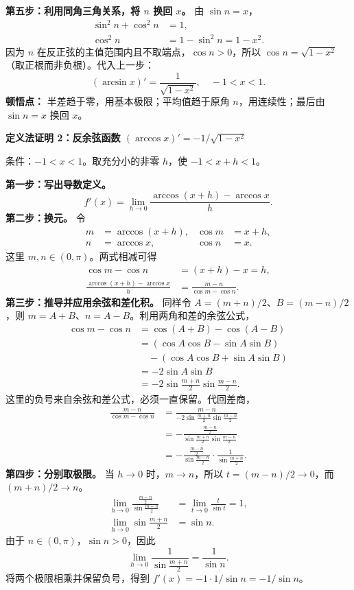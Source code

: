 \begin{proofbox}
\textbf{第五步：利用同角三角关系，将 $n$ 换回 $x$。} 由 $\sin n=x$，
\[
\begin{aligned}
\sin^2n+\cos^2n&=1,\\
\cos^2n&=1-\sin^2n=1-x^2.
\end{aligned}
\]
因为 $n$ 在反正弦的主值范围内且不取端点，$\cos n>0$，所以 $\cos n=\sqrt{1-x^2}$（取正根而非负根）。代入上一步：
\[
\boxed{(\arcsin x)'=\frac{1}{\sqrt{1-x^2}},\quad -1<x<1}.
\]
\textbf{顿悟点：} 半差趋于零，用基本极限；平均值趋于原角 $n$，用连续性；最后由 $\sin n=x$ 换回 $x$。

\medskip
\textbf{定义法证明 2：反余弦函数 $(\arccos x)'=-1/\sqrt{1-x^2}$}

条件：$-1<x<1$。取充分小的非零 $h$，使 $-1<x+h<1$。

\textbf{第一步：写出导数定义。}
\[
f'(x)=\lim_{h\to0}\frac{\arccos(x+h)-\arccos x}{h}.
\]
\textbf{第二步：换元。} 令
\[
\begin{aligned}
m&=\arccos(x+h),&\cos m&=x+h,\\
n&=\arccos x,&\cos n&=x.
\end{aligned}
\]
这里 $m,n\in(0,\pi)$。两式相减可得
\[
\begin{aligned}
\cos m-\cos n&=(x+h)-x=h,\\
\frac{\arccos(x+h)-\arccos x}{h}
&=\frac{m-n}{\cos m-\cos n}.
\end{aligned}
\]
\textbf{第三步：推导并应用余弦和差化积。} 同样令 $A=(m+n)/2$、$B=(m-n)/2$，则 $m=A+B$、$n=A-B$。利用两角和差的余弦公式，
\[
\begin{aligned}
\cos m-\cos n
&=\cos(A+B)-\cos(A-B)\\
&=(\cos A\cos B-\sin A\sin B)\\
&\quad-(\cos A\cos B+\sin A\sin B)\\
&=-2\sin A\sin B\\
&=-2\sin\frac{m+n}{2}\sin\frac{m-n}{2}.
\end{aligned}
\]
这里的负号来自余弦和差公式，必须一直保留。代回差商，
\[
\begin{aligned}
\frac{m-n}{\cos m-\cos n}
&=\frac{m-n}{-2\sin\frac{m+n}{2}\sin\frac{m-n}{2}}\\[4pt]
&=-\frac{\frac{m-n}{2}}{\sin\frac{m+n}{2}\sin\frac{m-n}{2}}\\[4pt]
&=-\frac{\frac{m-n}{2}}{\sin\frac{m-n}{2}}
\cdot\frac{1}{\sin\frac{m+n}{2}}.
\end{aligned}
\]
\textbf{第四步：分别取极限。} 当 $h\to0$ 时，$m\to n$，所以 $t=(m-n)/2\to0$，而 $(m+n)/2\to n$。
\[
\begin{aligned}
\lim_{h\to0}\frac{\frac{m-n}{2}}{\sin\frac{m-n}{2}}
&=\lim_{t\to0}\frac{t}{\sin t}=1,\\
\lim_{h\to0}\sin\frac{m+n}{2}&=\sin n.
\end{aligned}
\]
由于 $n\in(0,\pi)$，$\sin n>0$，因此
\[
\lim_{h\to0}\frac1{\sin\frac{m+n}{2}}=\frac1{\sin n}.
\]
将两个极限相乘并保留负号，得到 $f'(x)=-1\cdot1/\sin n=-1/\sin n$。


\end{proofbox}
